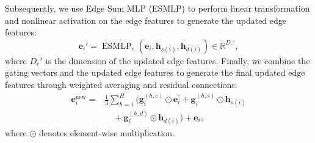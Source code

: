 Subsequently, we use Edge Sum MLP (ESMLP) to perform linear transformation and nonlinear activation on the edge features to generate the updated edge features:
\begin{equation}
\mathbf{e}_i' = \operatorname{ESMLP}_e\left( \mathbf{e}_i, \mathbf{h}_{s(i)}, \mathbf{h}_{d(i)} \right) \in \mathbb{R}^{D_e'},
\end{equation}
where $D_e'$ is the dimension of the updated edge features. Finally, we combine the gating vectors and the updated edge features to generate the final updated edge features through weighted averaging and residual connections:
\begin{equation}
\begin{aligned}
\mathbf{e}_i^{\text{new}} = &\frac{1}{3} \sum_{h=1}^H \bigg(
\mathbf{g}_i^{(h,e)} \odot \mathbf{e}_i^{\prime}
+ \mathbf{g}_i^{(h,s)} \odot \mathbf{h}_{s(i)} \\
&\quad + \mathbf{g}_i^{(h,d)} \odot \mathbf{h}_{d(i)}
\bigg) + \mathbf{e}_i,
\end{aligned}
\end{equation}
where $\odot$ denotes element-wise multiplication.

